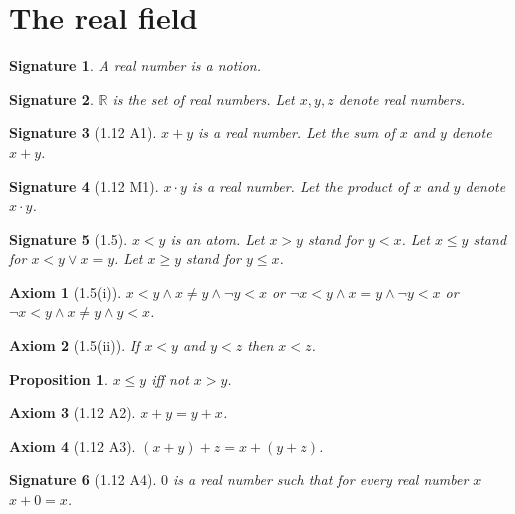 \documentclass{article}
\newenvironment{forthel}{\begin{leftbar}}{\end{leftbar}}
\newtheorem{axiom}{Axiom}
\newtheorem{signature}{Signature}
\newtheorem{proposition}{Proposition}
\begin{document}
\section{The real field}

\begin{forthel}
[number/-s]

\begin{signature} A \emph{real number} is a notion.\end{signature}
\begin{signature} $\mathbb{R}$ is the set of \emph{real numbers}.
Let $x,y,z$ denote real numbers.
\end{signature}

\begin{signature}[1.12 A1] $x + y$ is a real number.
Let the \emph{sum} of $x$ and $y$ denote $x + y$.\end{signature}

\begin{signature}[1.12 M1] $x \cdot y$ is a real number.
Let the product of $x$ and $y$ denote $x \cdot y$.\end{signature}

\begin{signature}[1.5] $x < y$ is an atom.
Let $x > y$ stand for $y < x$.
Let $x \leq y$ stand for $x < y \vee x = y$.
Let $x \geq y$ stand for $y \leq x$.\end{signature}

\begin{axiom}[1.5(i)] $x < y \wedge x \neq y \wedge \neg y < x$
or $\neg x < y \wedge x = y \wedge \neg y < x$
or $\neg x < y \wedge x \neq y \wedge y < x$.\end{axiom}

\begin{axiom}[1.5(ii)] If $x < y$ and $y < z$ then $x < z$.
\end{axiom}

\begin{proposition} $x \leq y$ iff not $x > y$.\end{proposition}

\begin{axiom}[1.12 A2] $x + y = y + x$.\end{axiom}

\begin{axiom}[1.12 A3] $(x + y) + z = x + (y + z)$.\end{axiom}

\begin{signature}[1.12 A4] $0$ is a real number such that
for every real number $x$ $x + 0 = x$.\end{signature}


\end{forthel}
\end{document}
